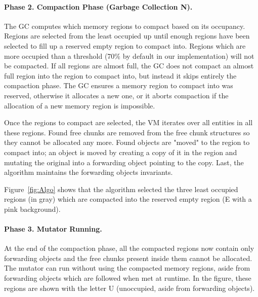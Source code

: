 \documentclass[sigplan,10pt,review,anonymous]{acmart}\settopmatter{printfolios=true,printccs=false,printacmref=false}
\newcommand{\egb}[1]{\color{blue}\fbox{\bfseries\sffamily\scriptsize Elisa:}{\sf\small$\blacktriangleright$\textit{#1}$\blacktriangleleft$}\color{black}}
\begin{document}
\paragraph{Phase 2. Compaction Phase (Garbage Collection N).} The GC computes which memory regions to compact based on its occupancy. Regions are selected from the least occupied up until enough regions have been selected to fill up a reserved empty region to compact into. Regions which are more occupied than a threshold (70\% by default in our implementation) will not be compacted.
If all regions are almost full, the GC does not compact an almost full region into the region to compact into, but instead it skips entirely the compaction phase.
The GC ensures a memory region to compact into was reserved, otherwise it allocates a new one, or it aborts compaction if the allocation of a new memory region is impossible.

Once the regions to compact are selected, the VM iterates over all entities in all these regions. Found free chunks are removed from the free chunk structures so they cannot be allocated any more. Found objects are "moved" to the region to compact into; an object is moved by creating a copy of it in the region and mutating the original into a forwarding object pointing to the copy.
Last, the algorithm maintains the forwarding objects invariants.

Figure~\ref{fig:Algo} shows that the algorithm selected the three least occupied regions (in gray) which are compacted into the reserved empty region (E with a pink background).

\paragraph{Phase 3. Mutator Running.}  At the end of the compaction phase, all the compacted regions now contain only forwarding objects and the free chunks present inside them cannot be allocated. 
The mutator can run without using the compacted memory regions, aside from forwarding objects which are followed when met at runtime. In the figure, these regions are shown with the letter U (unoccupied, aside from forwarding objects).
\end{document}
